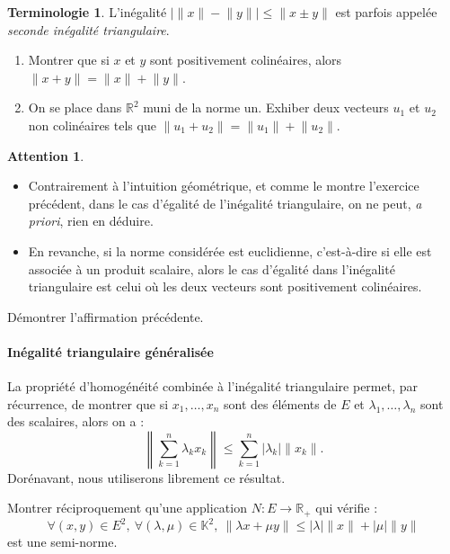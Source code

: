 \documentclass[french]{article}
\newcommand{\R}{\mathbb{R}}
\newcommand{\K}{\mathbb{K}}
\theoremstyle{plain}
\theoremstyle{definition}
\newtheorem*{terminologie}{Terminologie}
\newtheorem*{attention}{Attention}
\theoremstyle{remark}
\begin{document}
\begin{terminologie}
	L'inégalité $\lvert \lVert x\rVert-\lVert y\rVert\rvert\leqslant\lVert x\pm y\rVert$ est parfois appelée \textit{seconde inégalité triangulaire}.
\end{terminologie}

\begin{exo}
	\begin{enumerate}
		\item Montrer que si $x$ et $y$ sont positivement colinéaires, alors $\lVert x+y\rVert=\lVert x\rVert+\lVert y\rVert$.
		\item On se place dans $\R^2$ muni de la norme un. Exhiber deux vecteurs $u_1$ et $u_2$ non colinéaires tels que $\lVert u_1+u_2\rVert=\lVert u_1\rVert+\lVert u_2\rVert$.
	\end{enumerate}
\end{exo}

\begin{attention}
\begin{itemize}
	\item Contrairement à l'intuition géométrique, et comme le montre l'exercice précédent, dans le cas d'égalité de l'inégalité triangulaire, on ne peut, \textit{a priori}, rien en déduire.
	\item En revanche, si la norme considérée est euclidienne, c'est-à-dire si elle est associée à un produit scalaire, alors le cas d'égalité dans l'inégalité triangulaire est celui où les deux vecteurs sont positivement colinéaires.
\end{itemize}
\end{attention}

\begin{exo}
	Démontrer l'affirmation précédente.
\end{exo}

\paragraph{Inégalité triangulaire généralisée} La propriété d'homogénéité combinée à l'inégalité triangulaire permet, par récurrence, de montrer que si $x_1,\ldots,x_n$ sont des éléments de $E$ et $\lambda_1,\ldots,\lambda_n$ sont des scalaires, alors on a : $$\left\lVert\sum_{k=1}^{n}\lambda_kx_k\right\rVert\leqslant\sum_{k=1}^{n}\lvert\lambda_k\rvert\lVert x_k\rVert.$$ Dorénavant, nous utiliserons librement ce résultat.

\begin{exo}
	Montrer réciproquement qu'une application $N:E\to\R_+$ qui vérifie : $$\forall (x,y)\in E^2,\ \forall (\lambda,\mu)\in\K^2,\ \lVert\lambda x+\mu y\rVert\leqslant\lvert\lambda\rvert\lVert x\rVert+\lvert\mu\rvert\lVert y\rVert$$ est une semi-norme.
\end{exo}
\end{document}
